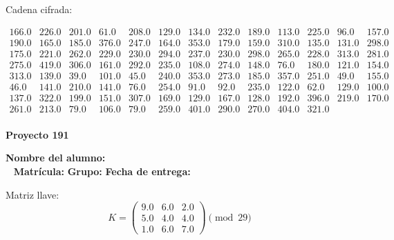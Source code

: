 \documentclass[12pt]{article}
\begin{document}
Cadena cifrada:
\begin{center}
$\begin{array}{lllllllllllll}
166.0 & 226.0 & 201.0 & 61.0 & 208.0 & 129.0 & 134.0 & 232.0 & 189.0 & 113.0 & 225.0 & 96.0 & 157.0\\
190.0 & 165.0 & 185.0 & 376.0 & 247.0 & 164.0 & 353.0 & 179.0 & 159.0 & 310.0 & 135.0 & 131.0 & 298.0\\
175.0 & 221.0 & 262.0 & 229.0 & 230.0 & 294.0 & 237.0 & 230.0 & 298.0 & 265.0 & 228.0 & 313.0 & 281.0\\
275.0 & 419.0 & 306.0 & 161.0 & 292.0 & 235.0 & 108.0 & 274.0 & 148.0 & 76.0 & 180.0 & 121.0 & 154.0\\
313.0 & 139.0 & 39.0 & 101.0 & 45.0 & 240.0 & 353.0 & 273.0 & 185.0 & 357.0 & 251.0 & 49.0 & 155.0\\
46.0 & 141.0 & 210.0 & 141.0 & 76.0 & 254.0 & 91.0 & 92.0 & 235.0 & 122.0 & 62.0 & 129.0 & 100.0\\
137.0 & 322.0 & 199.0 & 151.0 & 307.0 & 169.0 & 129.0 & 167.0 & 128.0 & 192.0 & 396.0 & 219.0 & 170.0\\
261.0 & 213.0 & 79.0 & 106.0 & 79.0 & 259.0 & 401.0 & 290.0 & 270.0 & 404.0 & 321.0\\
\end{array}$
\end{center}

\newpage


\textbf{Proyecto 191}

\textbf{Nombre del alumno:} \underline{\hspace{13cm}}\\\
\vspace{1cm}
\textbf{Matrícula:} \underline{\hspace{4cm}} \hspace{1cm}
\textbf{Grupo:} \underline{\hspace{2cm}}
\textbf{Fecha de entrega:} \underline{\hspace{2cm}}

\medskip

Matriz llave:
\[
K = \begin{pmatrix}
9.0 & 6.0 & 2.0\\
5.0 & 4.0 & 4.0\\
1.0 & 6.0 & 7.0
\end{pmatrix} \pmod{29}
\]
\end{document}
